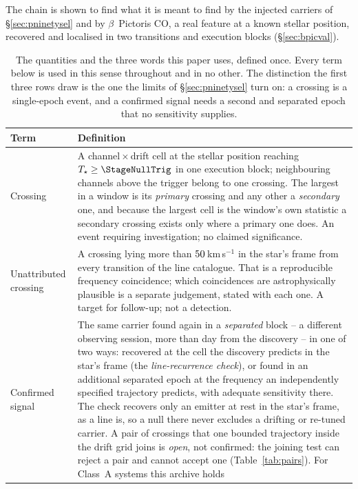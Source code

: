 The chain is shown to find what it is meant to find by the injected carriers
of \S\ref{sec:pninetysel} and by $\beta$~Pictoris CO, a real feature at a
known stellar position, recovered and localised in two transitions and
\CsBpCoBlocks{} execution blocks (\S\ref{sec:bpicval}).


\begin{table}
\centering
\caption{The quantities and the three words this paper uses, defined once.
Every term below is used in this sense throughout and in no other. The
distinction the first three rows draw is the one the limits of
\S\ref{sec:pninetysel} turn on: a crossing is a single-epoch event, and a
confirmed signal needs a second and separated epoch that no sensitivity
supplies.}
\label{tab:quantities}
\small
\begin{tabular}{@{}p{}p{}@{}}
\hline
Term & Definition \\
\hline
Crossing &
A channel\,$\times$\,drift cell at the stellar position reaching
$T_\star\geq\StageNullTrig$ in one execution block; neighbouring channels
above the trigger belong to one crossing. The largest in a window is its
\emph{primary} crossing and any other a \emph{secondary} one, and because the
largest cell is the window's own statistic a secondary crossing exists only
where a primary one does. An event requiring investigation; no claimed
significance. \\
Unattributed crossing &
A crossing lying more than $50$\,km\,s$^{-1}$ in the star's frame
from every transition of the line catalogue. That is a reproducible frequency
coincidence; which coincidences are astrophysically plausible is a separate
judgement, stated with each one. A target for follow-up; not a detection. \\
Confirmed signal &
The same carrier found again in a \emph{separated} block -- a different
observing session, more than \EpSep{} day from the discovery -- in one of two
ways: recovered at the cell the discovery predicts in the star's frame (the
\emph{line-recurrence check}), or found in an additional separated epoch at
the frequency an independently specified trajectory predicts, with adequate
sensitivity there. The check recovers
only an emitter at rest in the star's frame, as a line is, so a null there
never excludes a drifting or re-tuned carrier. A pair of crossings that one
bounded trajectory inside the drift grid joins is \emph{open}, not confirmed:
the joining test can reject a pair and cannot accept one
(Table~\ref{tab:pairs}). For \ZcNoRepSys{} Class~A systems this archive holds

\end{tabular}
\end{table}
